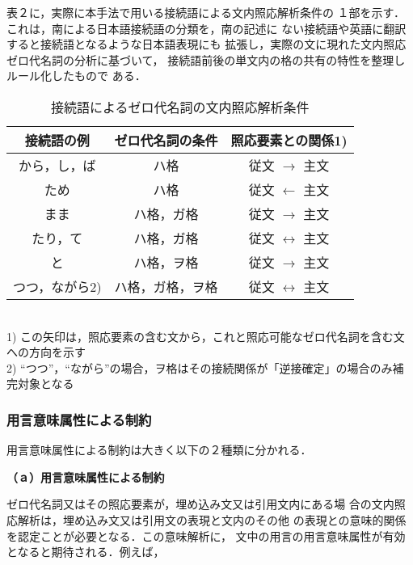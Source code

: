 表２に，実際に本手法で用いる接続語による文内照応解析条件の
１部を示す．これは，南による日本語接続語の分類を，南の記述に
ない接続語や英語に翻訳すると接続語となるような日本語表現にも
拡張し，実際の文に現れた文内照応ゼロ代名詞の分析に基づいて，
接続語前後の単文内の格の共有の特性を整理しルール化したもので
ある．

\begin{table}[htbp]
  \begin{center}
    \caption{接続語によるゼロ代名詞の文内照応解析条件}
    \vspace{2mm}
    \leavevmode
    \footnotesize
    \begin{tabular}{||c|c|c||} \hline \hline
    接続語の例 & ゼロ代名詞の条件 & 照応要素との関係{\scriptsize 1)}\\ \hline \hline
    から，し，ば & ハ格 & 従文 \( \rightarrow \) 
 主文 \\ \hline
    ため         & ハ格 & 従文 \( \leftarrow \) 
主文 \\ \hline
    まま         & ハ格，ガ格 & 従文 \( \rightarrow \)
主文 \\ \hline
    たり，て     & ハ格，ガ格 & 従文 \( \leftrightarrow \)
主文 \\ \hline
    と           & ハ格，ヲ格 & 従文 \( \rightarrow \) 
主文 \\ \hline
    つつ，ながら{\scriptsize 2)} & ハ格，ガ格，ヲ格 & 従文 \( \leftrightarrow \) 
主文 \\ \hline \hline
    \end{tabular} \\ 
   {\scriptsize 
    1) この矢印は，照応要素の含む文から，これと照応可能なゼロ代名詞を含む文への方向を示す\\
    2) ``つつ''，``ながら''の場合，ヲ格はその接続関係が「逆接確定」の場合のみ補完対象となる }
  \end{center}
  \label{tab:conj}
\end{table}

\subsubsection{用言意味属性による制約}

用言意味属性による制約は大きく以下の２種類に分かれる．

\vspace{2mm}
\noindent
{\bf （ａ）用言意味属性による制約}

\vspace{1mm}
ゼロ代名詞又はその照応要素が，埋め込み文又は引用文内にある場
合の文内照応解析は，埋め込み文又は引用文の表現と文内のその他
の表現との意味的関係を認定ことが必要となる．この意味解析に，
文中の用言の用言意味属性が有効となると期待される．例えば，

